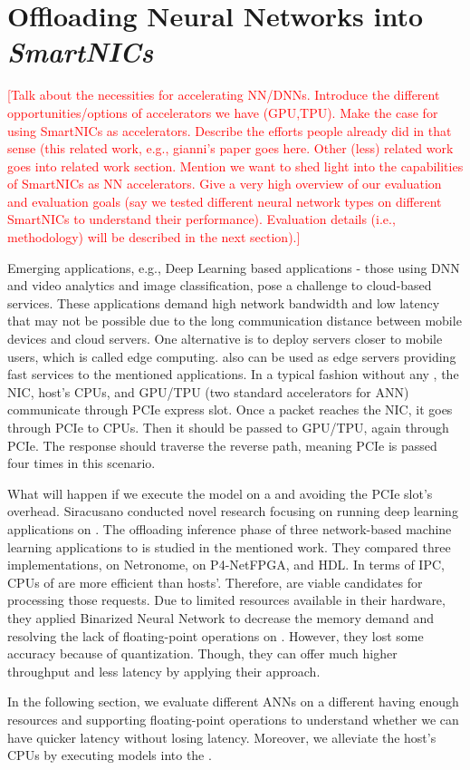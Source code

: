 \section{Offloading Neural Networks into \textit{SmartNICs}}
\label{sec-motive}

\textcolor{red}{[Talk about the necessities for accelerating NN/DNNs. Introduce the different opportunities/options of accelerators we have (GPU,TPU). Make the case for using SmartNICs as accelerators. Describe the efforts people already did in that sense (this related work, e.g., gianni's paper goes here. Other (less) related work goes into related work section. Mention we want to shed light into the capabilities of SmartNICs as NN accelerators. Give a very high overview of our evaluation and evaluation goals (say we tested different neural network types on different SmartNICs to understand their performance). Evaluation details (i.e., methodology) will be described in the next section).]}

Emerging applications, e.g., Deep Learning based applications - those using DNN and video analytics and image classification, pose a challenge to cloud-based services. These applications demand high network bandwidth and low latency that may not be possible due to the long communication distance between mobile devices and cloud servers. One alternative is to deploy servers closer to mobile users, which is called edge computing. \smartnics also can be used as edge servers providing fast services to the mentioned applications. In a typical fashion without any \smartnic, the NIC, host's CPUs, and GPU/TPU (two standard accelerators for ANN) communicate through PCIe express slot. Once a packet reaches the NIC, it goes through PCIe to CPUs. Then it should be passed to GPU/TPU, again through PCIe. The response should traverse the reverse path, meaning PCIe is passed four times in this scenario. 
\par
What will happen if we execute the model on a \smartnic and avoiding the PCIe slot's overhead. Siracusano \etal \cite{siracusano2020running} conducted novel research focusing on running deep learning applications on \smartnics. The offloading inference phase of three network-based machine learning applications to \smartnics is studied in the mentioned work. They compared three implementations, on Netronome, on P4-NetFPGA, and HDL. In terms of IPC, CPUs of \smartnics are more efficient than hosts'. Therefore, \smartnics are viable candidates for processing those requests. Due to limited resources available in their hardware, they applied Binarized Neural Network to decrease the memory demand and resolving the lack of floating-point operations on \smartnics. However, they lost some accuracy because of quantization. Though, they can offer much higher throughput and less latency by applying their approach.
\par
In the following section, we evaluate different ANNs on a different \smartnic having enough resources and supporting floating-point operations to understand whether we can have quicker latency without losing latency. Moreover, we alleviate the host's CPUs by executing models into the \smartnic.